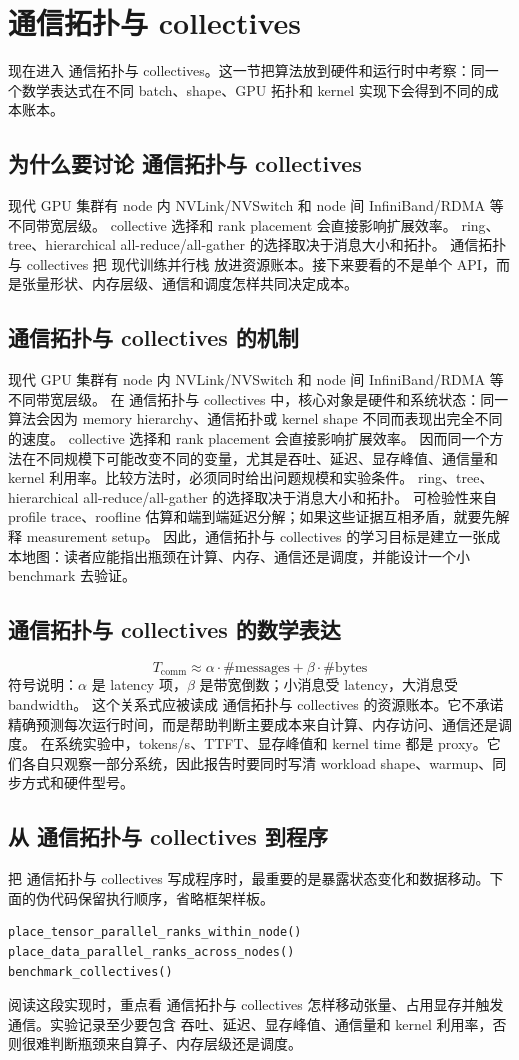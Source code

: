 \documentclass[a4paper]{article}
\begin{document}
\section{通信拓扑与 collectives}
现在进入 通信拓扑与 collectives。这一节把算法放到硬件和运行时中考察：同一个数学表达式在不同 batch、shape、GPU 拓扑和 kernel 实现下会得到不同的成本账本。
\subsection{为什么要讨论 通信拓扑与 collectives}
现代 GPU 集群有 node 内 NVLink/NVSwitch 和 node 间 InfiniBand/RDMA 等不同带宽层级。
collective 选择和 rank placement 会直接影响扩展效率。
ring、tree、hierarchical all-reduce/all-gather 的选择取决于消息大小和拓扑。
通信拓扑与 collectives 把 现代训练并行栈 放进资源账本。接下来要看的不是单个 API，而是张量形状、内存层级、通信和调度怎样共同决定成本。
\subsection{通信拓扑与 collectives 的机制}
现代 GPU 集群有 node 内 NVLink/NVSwitch 和 node 间 InfiniBand/RDMA 等不同带宽层级。 在 通信拓扑与 collectives 中，核心对象是硬件和系统状态：同一算法会因为 memory hierarchy、通信拓扑或 kernel shape 不同而表现出完全不同的速度。
collective 选择和 rank placement 会直接影响扩展效率。 因而同一个方法在不同规模下可能改变不同的变量，尤其是吞吐、延迟、显存峰值、通信量和 kernel 利用率。比较方法时，必须同时给出问题规模和实验条件。
ring、tree、hierarchical all-reduce/all-gather 的选择取决于消息大小和拓扑。 可检验性来自 profile trace、roofline 估算和端到端延迟分解；如果这些证据互相矛盾，就要先解释 measurement setup。
因此，通信拓扑与 collectives 的学习目标是建立一张成本地图：读者应能指出瓶颈在计算、内存、通信还是调度，并能设计一个小 benchmark 去验证。
\subsection{通信拓扑与 collectives 的数学表达}
\[T_{\text{comm}}\approx \alpha\cdot \#\text{messages}+\beta\cdot \#\text{bytes}\]
符号说明：\(\alpha\) 是 latency 项，\(\beta\) 是带宽倒数；小消息受 latency，大消息受 bandwidth。
这个关系式应被读成 通信拓扑与 collectives 的资源账本。它不承诺精确预测每次运行时间，而是帮助判断主要成本来自计算、内存访问、通信还是调度。
在系统实验中，tokens/s、TTFT、显存峰值和 kernel time 都是 proxy。它们各自只观察一部分系统，因此报告时要同时写清 workload shape、warmup、同步方式和硬件型号。
\subsection{从 通信拓扑与 collectives 到程序}
把 通信拓扑与 collectives 写成程序时，最重要的是暴露状态变化和数据移动。下面的伪代码保留执行顺序，省略框架样板。
\begin{lstlisting}[language=Python]
place_tensor_parallel_ranks_within_node()
place_data_parallel_ranks_across_nodes()
benchmark_collectives()
\end{lstlisting}
阅读这段实现时，重点看 通信拓扑与 collectives 怎样移动张量、占用显存并触发通信。实验记录至少要包含 吞吐、延迟、显存峰值、通信量和 kernel 利用率，否则很难判断瓶颈来自算子、内存层级还是调度。
\end{document}
